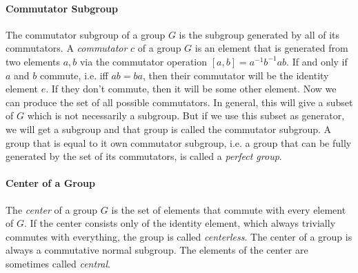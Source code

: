 \paragraph{Commutator Subgroup} The commutator subgroup of a group $G$ is the subgroup generated by all of its commutators. A \emph{commutator} $c$ of a group $G$ is an element that is generated from two elements $a,b$ via the commutator operation $[a,b] = a^{-1} b^{-1} a b$. If and only if $a$ and $b$ commute, i.e. iff $ab = ba$, then their commutator will be the identity element $e$. If they don't commute, then it will be some other element. Now we can produce the set of all possible commutators. In general, this will give a subset of $G$ which is not necessarily a subgroup. But if we use this subset as generator, we will get a subgroup and that group is called the commutator subgroup. A group that is equal to it own commutator subgroup, i.e. a group that can be fully generated by the set of its commutators, is called a \emph{perfect group}.




\paragraph{Center of a Group}
The \emph{center} of a group $G$ is the set of elements that commute with every element of $G$. If the center consists only of the identity element, which always trivially commutes with everything, the group is called \emph{centerless}. The center of a group is always a commutative normal subgroup. The elements of the center are sometimes called \emph{central}.




